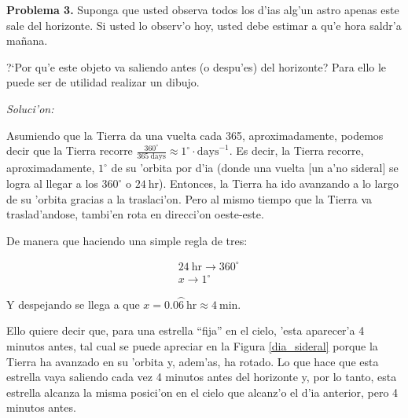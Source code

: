 \documentclass{article}
\begin{document}
\newpage

\textbf{Problema 3.} Suponga que usted observa todos los d'ias alg'un astro apenas este sale del horizonte. Si usted lo observ'o hoy, usted debe estimar a qu'e hora saldr'a mañana. 

?`Por qu'e este objeto va saliendo antes (o despu'es) del horizonte? Para ello le puede ser de utilidad realizar un dibujo.

\emph{Soluci'on:}

Asumiendo que la Tierra da una vuelta cada 365, aproximadamente, podemos decir que la Tierra recorre $\frac{360^{\circ}}{365 \ \text{days}} \approx 1^\circ \cdot \text{days}^{-1}$. Es decir, la Tierra recorre, aproximadamente, $1^{\circ}$ de su 'orbita por d'ia (donde una vuelta [un a'no sideral] se logra al llegar a los $360^\circ$ o $24 \ \text{hr}$). Entonces, la Tierra ha ido avanzando a lo largo de su 'orbita gracias a la traslaci'on. Pero al mismo tiempo que la Tierra va traslad'andose, tambi'en rota en direcci'on oeste-este. 

De manera que haciendo una simple regla de tres:

\begin{align*}
& 24 \ \text{hr} \rightarrow 360^\circ \\
& x  \rightarrow 1^{\circ}
\end{align*}

Y despejando se llega a que $x = 0.0\wideparen{6} \ \text{hr} \approx 4 \ \text{min}$. 

Ello quiere decir que, para una estrella ``fija'' en el cielo, 'esta aparecer'a 4 minutos antes, tal cual se puede apreciar en la Figura \ref{dia_sideral} porque la Tierra ha avanzado en su 'orbita y, adem'as, ha rotado. Lo que hace que esta estrella vaya saliendo cada vez 4 minutos antes del horizonte y, por lo tanto, esta estrella alcanza la misma posici'on en el cielo que alcanz'o el d'ia anterior, pero 4 minutos antes.
\end{document}
